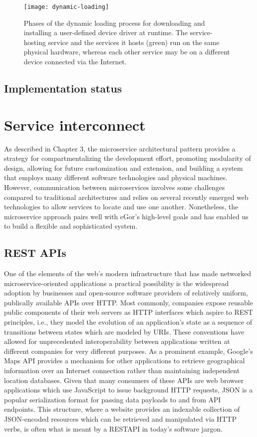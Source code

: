 \documentclass[../thesis]{subfiles}
\begin{document}
\begin{figure}
  \texttt{[image: dynamic-loading]}
  \caption{
    Phases of the dynamic loading process for downloading and
    installing a user-defined device driver at runtime. The
    service-hosting service and the services it hosts (green)
    run on the same physical hardware, whereas each other service may
    be on a different device connected via the Internet.
    \label{fig:DynamicLoading}
  }
\end{figure}

\subsection{Implementation status}



\section{Service interconnect}
As described in Chapter 3, the microservice architectural pattern
provides a strategy for compartmentalizing the development effort,
promoting modularity of design, allowing for future customization and
extension, and building a system that employs many different software
technologies and physical machines. However, communication between
microservices involves some challenges compared to traditional
architectures and relies on several recently emerged web technologies
to allow services to locate and use one another. Nonetheless,
the microservice approach pairs well with eGor's high-level goals and
has enabled us to build a flexible and sophisticated system.

\subsection{REST APIs}
One of the elements of the web's modern infrastructure that has made
networked microservice-oriented applications a practical possibility
is the widespread adoption by businesses and open-source software
providers of relatively uniform, publically available \glspl{API} over
HTTP. Most commonly, companies expose reusable public components of
their web servers as HTTP interfaces which aspire to \gls{REST}
principles, i.e., they model the evolution of an application's state
as a sequence of transitions between states which are modeled by
\glspl{URI}. These conventions have allowed for unprecedented
interoperability between applications written at different companies
for very different purposes. As a prominent example, Google's Maps
\gls{API} provides a mechanism for other applications to retrieve
geographical information over an Internet connection rather than
maintaining independent location databases. Given that many consumers
of these APIs are web browser applications which use JavaScript to
issue background HTTP requests, \gls{JSON} is a popular serialization
format for passing data payloads to and from API endpoints. This
structure, where a website provides an indexable collection of
\gls{JSON}-encoded resources which can be retrieved and manipulated
via HTTP verbs, is often what is meant by a \gls{RESTAPI} in today's
software jargon.
\end{document}
